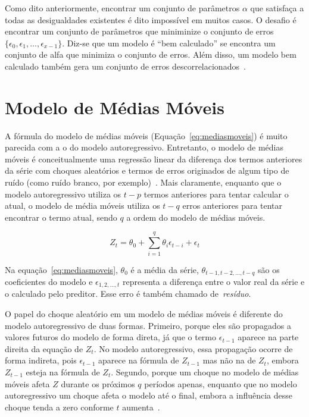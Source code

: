 Como dito anteriormente, encontrar um conjunto de parâmetros $\alpha$ que
satisfaça a todas as desigualdades existentes é dito impossível em muitos casos.
O desafio é encontrar um conjunto de parâmetros que miniminize o conjunto de
erros $\{\epsilon_0, \epsilon_1, \hdots, \epsilon_{x-1}\}$. Diz-se que um modelo
é ``bem calculado'' \label{Paragrafo:bemcalculado} se encontra um conjunto de
alfa que minimiza o conjunto de erros. Além disso, um modelo
bem calculado também gera um conjunto de erros descorrelacionados~\citep{Livro:analiseseriestemporais}.

\section{Modelo de Médias Móveis}

A fórmula do modelo de médias móveis (Equação~\ref{eq:mediasmoveis}) é muito
parecida com a o do modelo autoregressivo. Entretanto, o modelo de médias
móveis é conceitualmente uma regressão linear da diferença dos termos anteriores da série
com choques aleatórios e termos de erros originados de algum tipo de ruído
(como ruído branco, por exemplo)~\citep{Livro:analiseseriestemporais}. Mais
claramente, enquanto que o modelo autoregressivo utiliza os $t-p$ termos
anteriores para tentar calcular o atual, o modelo de média móveis utiliza os
$t-q$ erros anteriores para tentar encontrar o termo atual, sendo $q$ a ordem
do modelo de médias móveis.

\begin{equation}
Z_t = \theta_0 + \sum_{i=1}^q \theta_i\epsilon_{t-i} + \epsilon_t
\label{eq:mediasmoveis}
\end{equation}

Na equação~\ref{eq:mediasmoveis}, $\theta_0$ é a média da série,
$\theta_{t-1,t-2,\hdots,t-q}$ são os coeficientes do modelo e 
$\epsilon_{1,2,\hdots,t}$ representa a diferença entre o valor real da
série e o calculado pelo preditor. Esse erro é também chamado de~\emph{resíduo}.


O papel do choque aleatório em um modelo de médias móveis é diferente do modelo
autoregressivo de duas formas. Primeiro, porque eles são propagados a valores
futuros do modelo de forma direta, já que o termo $\epsilon_{t-1}$ aparece na
parte direita da equação de $Z_t$. No modelo autoregressivo, essa propagação
ocorre de forma indireta, pois $\epsilon_{t-1}$ aparece na fórmula de $Z_{t-1}$
mas não na de $Z_t$, embora $Z_{t-1}$ esteja na fórmula de $Z_t$. Segundo,
porque um choque no modelo de médias móveis afeta $Z$ durante os
próximos $q$ períodos apenas, enquanto que no modelo autoregressivo um choque afeta o modelo até o
final, embora a influência desse choque tenda a zero conforme $t$
aumenta~\citep{Livro:analiseseriestemporais}.

